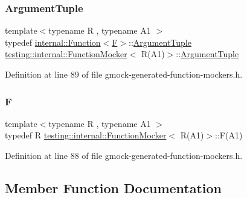 \subsubsection{\texorpdfstring{Argument\+Tuple}{ArgumentTuple}}
{\footnotesize\ttfamily template$<$typename R , typename A1 $>$ \\
typedef \hyperlink{structtesting_1_1internal_1_1Function}{internal\+::\+Function}$<$\hyperlink{classtesting_1_1internal_1_1FunctionMocker_3_01R_07A1_08_4_ada54286442ab14a18c2308cef748848f}{F}$>$\+::\hyperlink{classtesting_1_1internal_1_1FunctionMocker_3_01R_07A1_08_4_aacec6412ac4343c071d7dfe965558b0b}{Argument\+Tuple} \hyperlink{classtesting_1_1internal_1_1FunctionMocker}{testing\+::internal\+::\+Function\+Mocker}$<$ R(A1)$>$\+::\hyperlink{classtesting_1_1internal_1_1FunctionMocker_3_01R_07A1_08_4_aacec6412ac4343c071d7dfe965558b0b}{Argument\+Tuple}}



Definition at line 89 of file gmock-\/generated-\/function-\/mockers.\+h.

\mbox{\label{classtesting_1_1internal_1_1FunctionMocker_3_01R_07A1_08_4_ada54286442ab14a18c2308cef748848f}} 
\subsubsection{\texorpdfstring{F}{F}}
{\footnotesize\ttfamily template$<$typename R , typename A1 $>$ \\
typedef R \hyperlink{classtesting_1_1internal_1_1FunctionMocker}{testing\+::internal\+::\+Function\+Mocker}$<$ R(A1)$>$\+::F(A1)}



Definition at line 88 of file gmock-\/generated-\/function-\/mockers.\+h.



\subsection{Member Function Documentation}
\mbox{\label{classtesting_1_1internal_1_1FunctionMocker_3_01R_07A1_08_4_a4a58d37902572c8136d999c5008dce1a}} 
